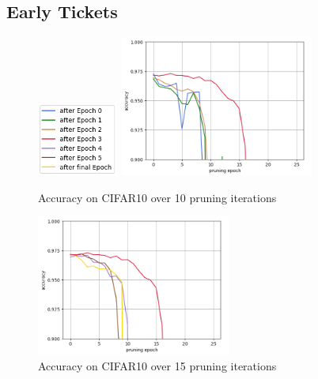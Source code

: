 \subsection*{Early Tickets}
\begin{figure}
	\begin{minipage}{\textwidth}
		\centering
		\includegraphics[width=100px]{gfx/7-Evaluation/LTH_5_legend.png}
	\end{minipage}
	\begin{minipage}{0.5\textwidth}
		\centering
		\includegraphics[height=175px]{gfx/Experiments/EarlyTicket-MNIST-FCN/012.png}
		\caption*{Accuracy on CIFAR10 over 10 pruning iterations}
		\label{?}
	\end{minipage}\hfill
	\begin{minipage}{0.5\textwidth}
		\centering
		\includegraphics[height=175px]{gfx/Experiments/EarlyTicket-MNIST-FCN/345.png}
		\caption*{Accuracy on CIFAR10 over 15 pruning iterations}
		\label{?}
	\end{minipage}
\end{figure}
